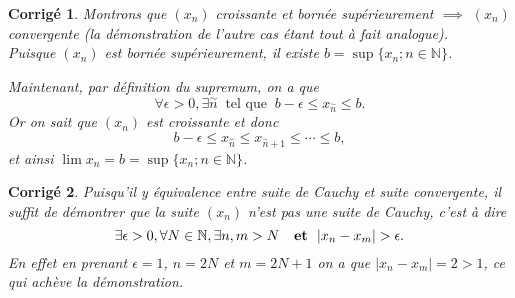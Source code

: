\documentclass[11pt,french,table]{article}
\theoremstyle{exercice}
\theoremstyle{corrigé}
\newtheorem{corrigé}{Corrigé}
\begin{document}
\vspace{1em}
\begin{corrigé}
\vspace{1em}
 Montrons que $(x_n)$ croissante et bornée supérieurement $\implies$ $(x_n)$ convergente (la démonstration de l’autre cas étant tout à fait analogue).\\
 
Puisque $(x_n)$ est bornée supérieurement, il existe $b = \sup\{x_n ; n \in \mathbb{N}\}$. 

Maintenant, par définition du supremum, on a que
\begin{equation*}
    \forall \epsilon >0, \exists \overset{\sim}{n} \ \text{ tel que } \ b-\epsilon \leq x_{\overset{\sim}{n}}\leq b.
\end{equation*}
Or on sait que  $(x_n)$ est croissante et donc \begin{equation*}
    b-\epsilon \leq x_{\overset{\sim}{n}}\leq x_{\overset{\sim}{n}+1}\leq \cdots \leq b,
\end{equation*}
et ainsi $\lim x_n=b=\sup\{x_n; n\in \mathbb{N}\}$. 
\end{corrigé}
\vspace{1em}
\begin{corrigé}
Puisqu'il y équivalence entre suite de Cauchy et suite convergente, il suffit de démontrer que la suite $(x_n)$ n'est pas une suite de Cauchy, c'est à dire 
\begin{equation*}
    \exists \epsilon >0, \forall N \in \mathbb{N}, \exists n,m >N \ \text{ \textbf{ et} } \ |x_n-x_m|>\epsilon.
\end{equation*}
En effet en prenant $\epsilon =1$, $n=2N$ et $m=2N+1$ on a que $|x_n-x_m|=2>1$, ce qui achève la démonstration. 
\end{corrigé}
\end{document}
